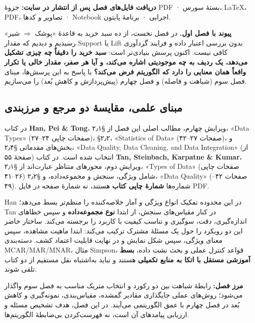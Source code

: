 \documentclass[12pt,a4paper,oneside]{book}
\begin{document}
\textbf{دریافت فایل‌های فصل پس از انتشار در سایت:} جزوهٔ PDF · بستهٔ سورس، LaTeX، PDF، تصاویر و کدها · Notebook اجرایی · برنامهٔ پایتون.

\textbf{پیوند با فصل اول.} در فصل نخست، از ده سبد خرید به قاعدهٔ «پوشک \(\Rightarrow\) شیر» رسیدیم و دیدیم که مقدار Support یا Lift بدون بررسی اعتبار داده و فرایند گردآوری کافی نیست. اکنون پرسش بنیادی‌تر است: \textbf{سبد خرید را دقیقاً چه چیزی تشکیل می‌دهد، یک ردیف به چه موجودیتی اشاره می‌کند، و آیا هر صفر، مقدار خالی یا تکرار واقعاً همان معنایی را دارد که الگوریتم فرض می‌کند؟} با پاسخ به این پرسش‌ها، مبنای فصل سوم (شباهت و فاصله) و فصل چهارم (پیش‌پردازش و کاهش بُعد) را می‌سازیم.

\subsection{مبنای علمی، مقایسهٔ دو مرجع و مرزبندی}\label{ux645ux628ux646ux627ux6cc-ux639ux644ux645ux6cc-ux645ux642ux627ux6ccux633ux647-ux62fux648-ux645ux631ux62cux639-ux648-ux645ux631ux632ux628ux646ux62fux6cc}

در کتاب \textbf{Han, Pei \& Tong}، ویرایش چهارم، مطالب اصلی این فصل از §۲٫۱، «Data Types» (صفحات چاپی ۲۴--۲۷)، §۲٫۲، «Statistics of Data» (صفحات ۲۷--۴۲)، و بخش‌های مقدماتی §۲٫۴، «Data Quality, Data Cleaning, and Data Integration» (از صفحهٔ ۵۵) انتخاب شده است. در کتاب \textbf{Tan, Steinbach, Karpatne \& Kumar}، ویرایش دوم، محورهای متناظر عبارت‌اند از §۲٫۱، «Types of Data» (صفحات چاپی ۲۶--۴۱) شامل ویژگی، سنجش و مجموعه‌داده، و §۲٫۲، «Data Quality» (صفحات ۴۲--۴۹). شماره‌ها \textbf{شمارهٔ چاپی کتاب} هستند، نه شمارهٔ صفحه در فایل PDF.

Han در این محدوده تفکیک انواع ویژگی و آمار خلاصه‌کننده را منظم‌تر بسط می‌دهد؛ Tan در کنار مقیاس‌های سنجش، از ابتدا \textbf{نوع مجموعه‌داده} و سپس خطاهای اندازه‌گیری، دقت، سوگیری و تناسب کیفیت با کاربرد را برجسته می‌کند. ساختار حاضر این دو رویکرد را حول یک مسئلهٔ مشترک ترکیب می‌کند: ابتدا ماهیت مشاهده، سپس معنای ویژگی، سپس شکل نمایش و در نهایت قابلیت اعتماد کشف. دسته‌بندی MCAR/MAR/MNAR، مثال Simpson، قواعد کنترل عملی و بحث نشت داده، \textbf{بسط آموزشی مستقل با اتکا به منابع تکمیلی} هستند و نباید به‌اشتباه نقل مستقیم از دو کتاب تلقی شوند.

\textbf{مرز فصل:} رابطهٔ شباهت بین دو رکورد و انتخاب متریک مناسب به فصل سوم واگذار می‌شود؛ روش‌های عملی جایگذاری مقادیر گمشده، مقیاس‌بندی، نمونه‌گیری و کاهش بُعد در فصل چهارم با عمق الگوریتمی می‌آیند. در این فصل، هدف تشخیص مسئله و ارزیابی پیامدهای آن است، نه فهرست‌کردن بی‌ضابطهٔ الگوریتم‌ها.
\end{document}
